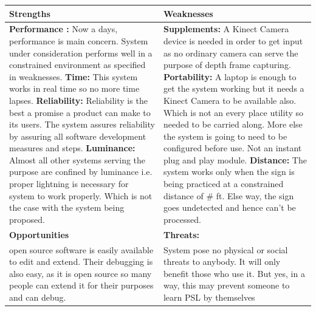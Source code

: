 \begin{center}
	\begin{tabular}{ |p{7cm}|p{7cm}| } 
		\hline
		\textbf{Strengths} & \textbf{Weaknesses}\\
		\hline
		\textbf{Performance :} 
		Now a days, performance is main concern. System under consideration performs well in a constrained environment as specified in weaknesses. \newline 
		\textbf{Time:} \newline 
		This system works in real time so no more time lapses.\newline 
		\textbf{Reliability:} \newline
		Reliability is the best a promise a product can make to its users. The system assures reliability by assuring all software development measures and steps. \newline
		\textbf{Luminance: }\newline 
		Almost all other systems serving the purpose are confined by luminance i.e. proper lightning is necessary for system to work properly. Which is not the case with the system being proposed.
		& \textbf{Supplements:} \newline
		A Kinect Camera device is needed in order to get input as no ordinary camera can serve the purpose of depth frame capturing.  \newline
		\textbf{Portability:}\newline
		A laptop is enough to get the system working but it needs a Kinect Camera to be available also. Which is not an every place utility so needed to be carried along. More else the system is going to need to be configured before use. Not an instant plug and play module.\newline
		\textbf{Distance:} \newline
		The system works only when the sign is being practiced at a constrained distance of \# ft. Else way, the sign goes undetected and hence can’t be processed. \\
	
		\hline
		\textbf{Opportunities} &  \textbf{ Threats:}\\
		
		 \hline 
		 open source software is easily available to edit and extend. Their debugging is also easy, as it is open source so many people can extend it for their purposes and can debug. &
		  System pose no physical or social threats to anybody. It will only benefit those who use it. But yes, in a way, this may prevent someone to learn PSL by themselves  \\
		\hline
	\end{tabular}
\end{center}



